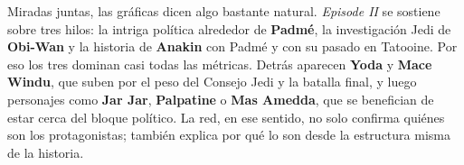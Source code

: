 Miradas juntas, las gr\'aficas dicen algo bastante natural. \textit{Episode II} se sostiene sobre tres hilos: la intriga pol\'itica alrededor de \textbf{Padm\'e}, la investigaci\'on Jedi de \textbf{Obi-Wan} y la historia de \textbf{Anakin} con Padm\'e y con su pasado en Tatooine. Por eso los tres dominan casi todas las m\'etricas. Detr\'as aparecen \textbf{Yoda} y \textbf{Mace Windu}, que suben por el peso del Consejo Jedi y la batalla final, y luego personajes como \textbf{Jar Jar}, \textbf{Palpatine} o \textbf{Mas Amedda}, que se benefician de estar cerca del bloque pol\'itico. La red, en ese sentido, no solo confirma qui\'enes son los protagonistas; tambi\'en explica por qu\'e lo son desde la estructura misma de la historia.
